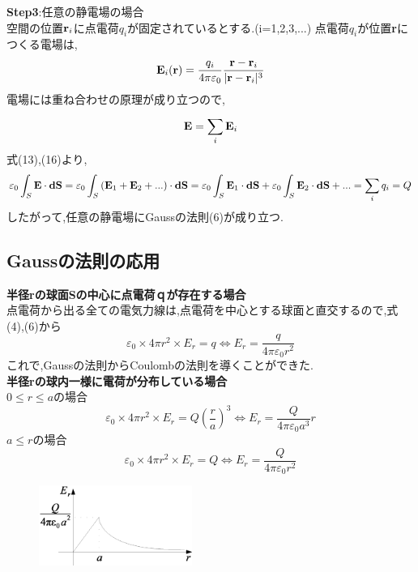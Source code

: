 \documentclass[../main]{subfiles}
\begin{document}
\noindent
{\bf Step3}:任意の静電場の場合 \\
空間の位置${\bf r}_i$に点電荷$q_i$が固定されているとする.(i=1,2,3,...)
点電荷$q_i$が位置{\bf r}につくる電場は,
\begin{eqnarray}
{\bf E}_i({\bf r}) = \frac{q_i}{4 \pi \varepsilon_0} \frac{{\bf r}-{\bf r}_i}{|{\bf r}-{\bf r}_i|^3}
\end{eqnarray}
電場には重ね合わせの原理が成り立つので,
\begin{eqnarray}
{\bf E}=\sum_{i}^{}{\bf E}_i
\end{eqnarray}
式(13),(16)より,
\begin{equation}
\varepsilon_0 \int_{S}{}{\bf E}\cdot{\bf dS}=\varepsilon_0 \int_{S}{}({\bf E}_1 + {\bf E}_2 + ...) \cdot {\bf dS} \\
=\varepsilon_0 \int_{S}{}{\bf E}_1 \cdot {\bf dS} + \varepsilon_0 \int_{S}{}{\bf E}_2 \cdot {\bf dS} + ... \\
= \sum_{i}^{} q_i = Q
\end{equation}
したがって,任意の静電場にGaussの法則(6)が成り立つ.

\subsection{Gaussの法則の応用}
\noindent
{\bf 半径rの球面Sの中心に点電荷ｑが存在する場合} \\
点電荷から出る全ての電気力線は,点電荷を中心とする球面と直交するので,式(4),(6)から
\begin{equation}
\varepsilon_0 \times 4 \pi r^2 \times E_r = q \Leftrightarrow E_r = \frac{q}{4 \pi \varepsilon_0 r^2}
\end{equation}
これで,Gaussの法則からCoulombの法則を導くことができた.\\

\noindent
{\bf 半径rの球内一様に電荷が分布している場合}\\
$ 0 \leq r \leq a $の場合\\
\begin{equation}
\varepsilon_0 \times 4 \pi r^2 \times E_r = Q {\left(\frac{r}{a} \right)}^3 \Leftrightarrow E_r = \frac{Q}{4 \pi \varepsilon_0 a^3}r
\end{equation}
$a \leq r$の場合\\
\begin{equation}
\varepsilon_0 \times 4 \pi r^2 \times E_r = Q \Leftrightarrow E_r = \frac{Q}{4 \pi \varepsilon_0 r^2}
\end{equation}

\begin{figure}[htbp]
 \begin{center}
  \includegraphics[width=50mm]{2.4.eps}
 \end{center}
 \caption{}
 \label{fig:one}
\end{figure}
\end{document}
